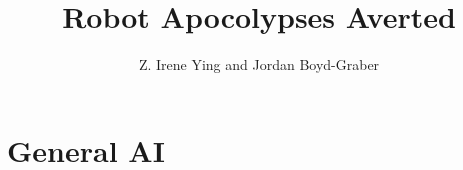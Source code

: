 \documentclass[a4paper,twosided,justified,nobib]{tufte-book}
\title{Robot Apocolypses Averted}
\author{Z. Irene Ying and Jordan Boyd-Graber}
\begin{document}

\frontmatter







\chapter{General AI}
\label{chap:gai}





\backmatter





\printindex
\end{document}
